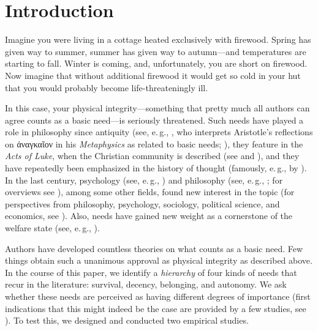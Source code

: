 \documentclass[10pt,letterpaper]{article}
\begin{document}
\linenumbers


\section*{Introduction}\label{sec:introduction}
Imagine you were living in a cottage heated exclusively with firewood.
Spring has given way to summer, summer has given way to autumn---and temperatures are starting to fall.
Winter is coming, and, unfortunately, you are short on firewood.
Now imagine that without additional firewood it would get so cold in your hut that you would probably become life-threateningly ill.

In this case, your physical integrity---something that pretty much all authors can agree counts as a basic need---is seriously threatened.
Such needs have played a role in philosophy since antiquity (see, e.\,g., \cite{poelzler_basic_2021}, who interprets Aristotle's reflections on \textgreek{ἀναγκαῖον} in his \textit{Metaphysics} as related to basic needs; \cite[1015a20--1015b15]{aristotle_metaphysics_1933}), they feature in the \textit{Acts of Luke}, when the Christian community is described (see \cite[p. 141f.]{luke_apostelgeschichte_2016} and \cite[p.~302f.]{bauer_gerechtigkeit_2019}), and they have repeatedly been emphasized in the history of thought (famously, e.\,g., by \cite{marx_kritik_1969}).
In the last century, psychology (see, e.\,g., \cite{maslow_theory_1943,alderfer_existence_1972}) and philosophy (see, e.\,g., \cite{thomson_need_1987,miller_principles_1999,hamilton_political_2003}; for overviews see \cite{brock_needs_2019,miller_needs_2020,siebel_need-based_2020,poelzler_basic_2021}), among some other fields, found new interest in the topic (for perspectives from philosophy, psychology, sociology, political science, and economics, see \cite{kittel_need-based_2020}).
Also, needs have gained new weight as a cornerstone of the welfare state (see, e.\,g., \cite{esping-andersen_three_1990}).

Authors have developed countless theories on what counts as a basic need.
Few things obtain such a unanimous approval as physical integrity as described above.
In the course of this paper, we identify a \textit{hierarchy} of four kinds of needs that recur in the literature: survival, decency, belonging, and autonomy.
We ask whether these needs are perceived as having different degrees of importance (first indications that this might indeed be the case are provided by a few studies, see \cite{poelzler_typicality_2022,bauer_needs_forthcoming}).
To test this, we designed and conducted two empirical studies.
\end{document}
